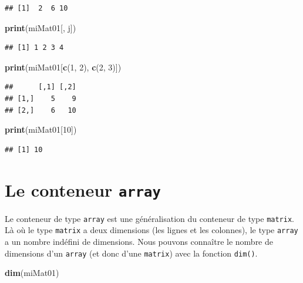\documentclass[]{book}
\newenvironment{Shaded}{\begin{snugshade}}{\end{snugshade}}
\newcommand{\DecValTok}[1]{\textcolor[rgb]{0.00,0.00,0.81}{#1}}
\newcommand{\KeywordTok}[1]{\textcolor[rgb]{0.13,0.29,0.53}{\textbf{#1}}}
\newcommand{\NormalTok}[1]{#1}
\begin{document}
\begin{verbatim}
## [1]  2  6 10
\end{verbatim}

\begin{Shaded}
\begin{Highlighting}[]
\KeywordTok{print}\NormalTok{(miMat01[, j])}
\end{Highlighting}
\end{Shaded}

\begin{verbatim}
## [1] 1 2 3 4
\end{verbatim}

\begin{Shaded}
\begin{Highlighting}[]
\KeywordTok{print}\NormalTok{(miMat01[}\KeywordTok{c}\NormalTok{(}\DecValTok{1}\NormalTok{, }\DecValTok{2}\NormalTok{), }\KeywordTok{c}\NormalTok{(}\DecValTok{2}\NormalTok{, }\DecValTok{3}\NormalTok{)])}
\end{Highlighting}
\end{Shaded}

\begin{verbatim}
##      [,1] [,2]
## [1,]    5    9
## [2,]    6   10
\end{verbatim}

\begin{Shaded}
\begin{Highlighting}[]
\KeywordTok{print}\NormalTok{(miMat01[}\DecValTok{10}\NormalTok{])}
\end{Highlighting}
\end{Shaded}

\begin{verbatim}
## [1] 10
\end{verbatim}

\hypertarget{l014array}{%
\section{\texorpdfstring{Le conteneur \texttt{array}}{Le conteneur array}}\label{l014array}}

Le conteneur de type \texttt{array} est une généralisation du conteneur de type \texttt{matrix}. Là où le type \texttt{matrix} a deux dimensions (les lignes et les colonnes), le type \texttt{array} a un nombre indéfini de dimensions. Nous pouvons connaître le nombre de dimensions d'un \texttt{array} (et donc d'une \texttt{matrix}) avec la fonction \texttt{dim()}.

\begin{Shaded}
\begin{Highlighting}[]
\KeywordTok{dim}\NormalTok{(miMat01)}
\end{Highlighting}
\end{Shaded}
\end{document}

